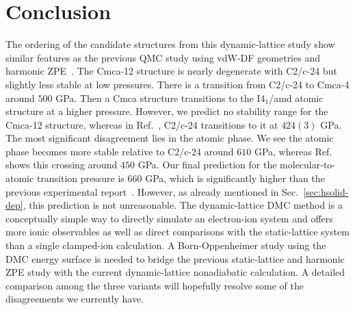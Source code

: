 \section{Conclusion}
The ordering of the candidate structures from this dynamic-lattice study show similar features as the previous QMC study using vdW-DF geometries and harmonic ZPE~\cite{McMinis2015}.
The Cmca-12 structure is nearly degenerate with C2/c-24 but slightly less stable at low pressures.
There is a transition from C2/c-24 to Cmca-4 around $500$ GPa.
Then a Cmca structure transitions to the I4$_1$/amd atomic structure at a higher pressure.
However, we predict no stability range for the Cmca-12 structure, whereas in Ref.~\cite{McMinis2015}, C2/c-24 transitions to it at $424(3)$ GPa.
The most significant disagreement lies in the atomic phase.
We see the atomic phase becomes more stable relative to C2/c-24 around $610$ GPa, whereas Ref.~\cite{McMinis2015} shows this crossing around $450$ GPa.
Our final prediction for the molecular-to-atomic transition pressure is $660$ GPa, which is significantly higher than the previous experimental report~\cite{Silvera2017}.
However, as already mentioned in Sec.~\ref{sec:hsolid-dep}, this prediction is not unreasonable.
The dynamic-lattice DMC method is a conceptually simple way to directly simulate an electron-ion system and offers more ionic observables as well as direct comparisons with the static-lattice system than a single clamped-ion calculation.
A Born-Oppenheimer study using the DMC energy surface is needed to bridge the previous static-lattice and harmonic ZPE study with the current dynamic-lattice nonadiabatic calculation.
A detailed comparison among the three variants will hopefully resolve some of the disagreements we currently have.

